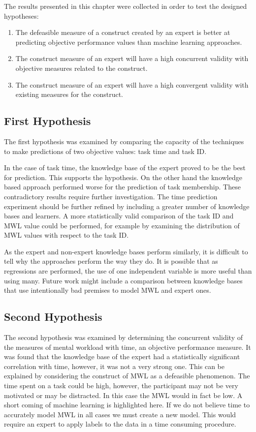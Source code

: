The results presented in this chapter were collected in order to test the designed hypotheses:

\begin{enumerate}
  \item The defeasible measure of a construct created by an expert is better at predicting objective performance values than machine learning approaches.
  \item The construct measure of an expert will have a high concurrent validity with objective measures related to the construct.
  \item The construct measure of an expert will have a high convergent validity with existing measures for the construct.
\end{enumerate}

\subsection{First Hypothesis}

The first hypothesis was examined by comparing the capacity of the techniques to make predictions of two objective values: task time and task ID.  

In the case of task time, the knowledge base of the expert proved to be the best for prediction. This supports the hypothesis. On the other hand the knowledge based approach performed worse for the prediction of task membership. These contradictory results require further investigation. The time prediction experiment should be further refined by including a greater number of knowledge bases and learners. A more statistically valid comparison of the task ID and MWL value could be performed, for example by examining the distribution of MWL values with respect to the task ID.

As the expert and non-expert knowledge bases perform similarly, it is difficult to tell why the approaches perform the way they do. It is possible that as regressions are performed, the use of one independent variable is more useful than using many. Future work might include a comparison between knowledge bases that use intentionally bad premises to model MWL and expert ones.

\subsection{Second Hypothesis}

The second hypothesis was examined by determining the concurrent validity of the measures of mental workload with time, an objective performance measure. It was found that the knowledge base of the expert had a statistically significant correlation with time, however, it was not a very strong one. This can be explained by considering the construct of MWL as a defeasible phenomenon. The time spent on a task could be high, however, the participant may not be very motivated or may be distracted. In this case the MWL would in fact be low. A short coming of machine learning is highlighted here. If we do not believe time to accurately model MWL in all cases we must create a new model. This would require an expert to apply labels to the data in a time consuming procedure.

